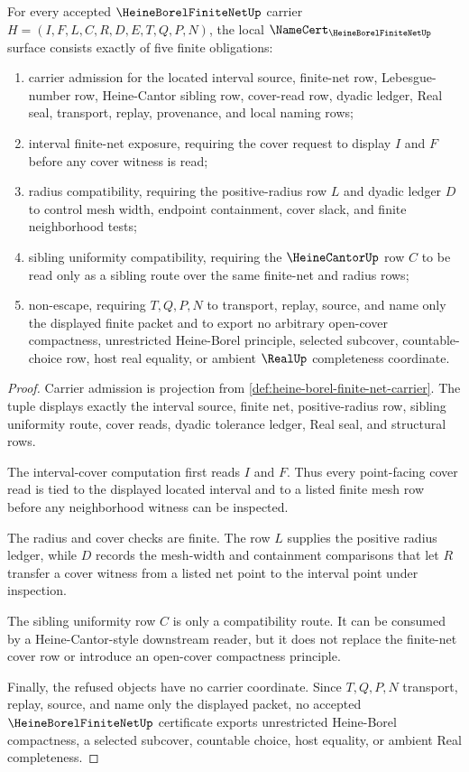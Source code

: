 \begin{theorem}
\label{thm:heine-borel-finite-net-namecert-obligations}
For every accepted $\HeineBorelFiniteNetUp$ carrier $H=(I,F,L,C,R,D,E,T,Q,P,N)$, the local $\NameCert_{\HeineBorelFiniteNetUp}$ surface consists exactly of five finite obligations:
\begin{enumerate}
\item carrier admission for the located interval source, finite-net row, Lebesgue-number row, Heine-Cantor sibling row, cover-read row, dyadic ledger, Real seal, transport, replay, provenance, and local naming rows;
\item interval finite-net exposure, requiring the cover request to display $I$ and $F$ before any cover witness is read;
\item radius compatibility, requiring the positive-radius row $L$ and dyadic ledger $D$ to control mesh width, endpoint containment, cover slack, and finite neighborhood tests;
\item sibling uniformity compatibility, requiring the $\HeineCantorUp$ row $C$ to be read only as a sibling route over the same finite-net and radius rows;
\item non-escape, requiring $T,Q,P,N$ to transport, replay, source, and name only the displayed finite packet and to export no arbitrary open-cover compactness, unrestricted Heine-Borel principle, selected subcover, countable-choice row, host real equality, or ambient $\RealUp$ completeness coordinate.
\end{enumerate}
\end{theorem}
\begin{proof}
Carrier admission is projection from \autoref{def:heine-borel-finite-net-carrier}. The tuple displays exactly the interval source, finite net, positive-radius row, sibling uniformity route, cover reads, dyadic tolerance ledger, Real seal, and structural rows.

The interval-cover computation first reads $I$ and $F$. Thus every point-facing cover read is tied to the displayed located interval and to a listed finite mesh row before any neighborhood witness can be inspected.

The radius and cover checks are finite. The row $L$ supplies the positive radius ledger, while $D$ records the mesh-width and containment comparisons that let $R$ transfer a cover witness from a listed net point to the interval point under inspection.

The sibling uniformity row $C$ is only a compatibility route. It can be consumed by a Heine-Cantor-style downstream reader, but it does not replace the finite-net cover row or introduce an open-cover compactness principle.

Finally, the refused objects have no carrier coordinate. Since $T,Q,P,N$ transport, replay, source, and name only the displayed packet, no accepted $\HeineBorelFiniteNetUp$ certificate exports unrestricted Heine-Borel compactness, a selected subcover, countable choice, host equality, or ambient Real completeness.
\end{proof}

